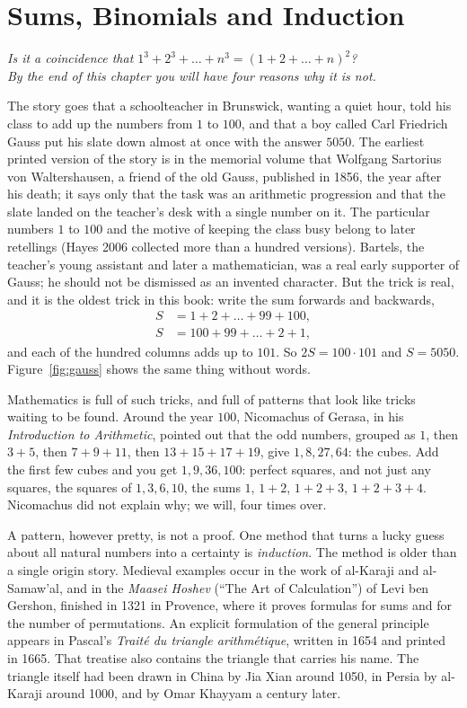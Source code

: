 \chapter{Sums, Binomials and Induction}\label{ch:sums}

\begin{center}\itshape
Is it a coincidence that $1^3+2^3+\dots+n^3=(1+2+\dots+n)^2$?\\
By the end of this chapter you will have four reasons why it is not.
\end{center}

The story goes that a schoolteacher in Brunswick, wanting a quiet hour, told his class to add up the numbers from $1$ to $100$, and that a
boy called Carl Friedrich Gauss put his slate down almost at once with the answer $5050$. The earliest printed version of the story is in the
memorial volume that Wolfgang Sartorius von Waltershausen, a friend of the old Gauss, published in 1856, the year after his death; it says only that
the task was an arithmetic progression and that the slate landed on the teacher's desk with a single number on it. The particular numbers $1$ to $100$ and the motive of keeping the class busy belong to later retellings
(Hayes 2006 collected more than a hundred versions). Bartels, the teacher's young assistant and later a mathematician,
was a real early supporter of Gauss; he should not be dismissed as an invented character. But the trick is real, and it is the oldest trick in this book: write the sum forwards and
backwards,
\[
\begin{aligned}
S&=1+2+\dots+99+100,\\
S&=100+99+\dots+2+1,
\end{aligned}
\]
and each of the hundred columns adds up to $101$. So $2S=100\cdot101$ and $S=5050$. Figure~\ref{fig:gauss} shows the same thing without words.

Mathematics is full of such tricks, and full of patterns that look like tricks waiting to be found. Around the year $100$, Nicomachus of Gerasa, in his
\emph{Introduction to Arithmetic}, pointed out that the odd numbers, grouped as $1$, then $3+5$, then $7+9+11$, then $13+15+17+19$, give $1,8,27,64$: the
cubes. Add the first few cubes and you get $1,9,36,100$: perfect squares, and not just any squares, the squares of $1,3,6,10$, the sums $1$, $1+2$,
$1+2+3$, $1+2+3+4$. Nicomachus did not explain why; we will, four times over.

A pattern, however pretty, is not a proof. One method that turns a lucky guess about all natural numbers into a certainty is \emph{induction}. The method is older than a single origin story. Medieval examples occur in the work of al-Karaji and al-Samaw'al, and in the \emph{Maasei Hoshev} (``The Art of Calculation'') of Levi ben Gershon, finished in 1321 in Provence, where it proves formulas for sums and for the number of permutations. An explicit formulation of the general principle appears in Pascal's \emph{Trait\'e du triangle arithm\'etique}, written in 1654 and printed in 1665. That treatise also contains the triangle that carries his name. The triangle itself had been drawn in China by Jia Xian around 1050, in Persia by al-Karaji around 1000, and by Omar Khayyam a century later.

